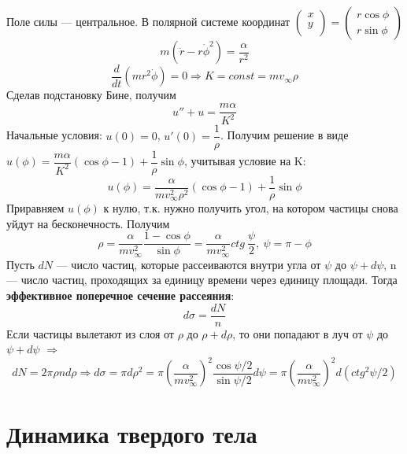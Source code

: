 Поле силы --- центральное. В полярной системе координат $\begin{pmatrix}
    x\\y\\
\end{pmatrix} = \begin{pmatrix}
    r\cos{\phi}\\r\sin{\phi}
\end{pmatrix}$
\[
m(\ddot{r} - r\dot{\phi}^2) = \dfrac{\alpha}{r^2}
\]
\[
\dfrac{d}{dt} (mr^2\dot{\phi}) = 0 \Longrightarrow K = const = mv_\infty\rho
\]
Сделав подстановку Бине, получим
\[
u'' + u = \dfrac{m\alpha}{K^2}
\]
Начальные условия: $u(0) = 0$, $u'(0) =\dfrac{1}{\rho}$. Получим решение в виде $u(\phi) = \dfrac{m\alpha}{K^2}(\cos{\phi} - 1) + \dfrac{1}{\rho}\sin{\phi}$, учитывая условие на K:
\[
u(\phi) = \dfrac{\alpha}{mv_\infty^2\rho^2}(\cos{\phi} - 1) + \dfrac{1}{\rho}\sin{\phi}
\]
Приравняем $u(\phi)$ к нулю, т.к. нужно получить угол, на котором частицы снова уйдут на бесконечность. Получим
\[
\rho = \dfrac{\alpha}{mv_\infty^2}\dfrac{1 - \cos{\phi}}{\sin{\phi}} = \dfrac{\alpha}{mv_\infty^2} ctg~\dfrac{\psi}{2}, \ \psi = \pi - \phi
\]
Пусть $d N$ --- число частиц, которые рассеиваются внутри угла от $\psi$ до $\psi + d \psi$, n --- число частиц, проходящих за единицу времени через единицу площади. Тогда \textbf{эффективное поперечное сечение рассеяния}:
\[
d \sigma = \dfrac{d N}{n}
\]
Если частицы вылетают из слоя от $\rho$ до $\rho + d\rho$, то они попадают в луч от $\psi$ до $\psi + d\psi$ $\Longrightarrow$
\[
dN = 2\pi\rho nd\rho \Longrightarrow d \sigma = \pi d\rho^2 = \pi \left(\dfrac{\alpha}{mv_\infty^2}\right)^2\dfrac{\cos{\psi / 2}}{\sin{\psi / 2}}d\psi = \pi \left(\dfrac{\alpha}{mv_\infty^2}\right)^2 d(ctg^2\psi/2)
\]

\section{Динамика твердого тела}
